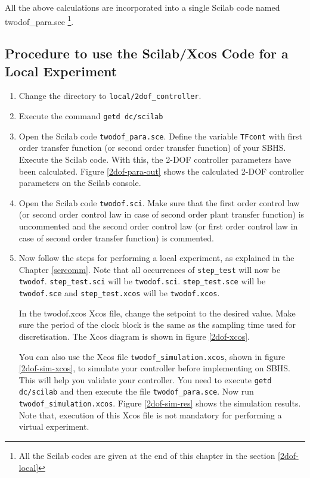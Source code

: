 All the above calculations are incorporated into a single Scilab code named {\ttfamily twodof\_para.sce} 
\footnote{All the Scilab codes are given at the end of this chapter in the section \ref{2dof-local}}.
\subsection{Procedure to use the Scilab/Xcos Code for a Local Experiment }\label{sec-steps}
\begin{enumerate}
\item Change the directory to {\tt local/2dof\_controller}. 
\item Execute the command {\tt getd dc/scilab}
\item Open the Scilab code {\tt twodof\_para.sce}. Define the variable {\tt TFcont} with first order transfer 
function (or second order transfer function) of your SBHS. Execute the Scilab code. With this, the 2-DOF controller 
parameters have been calculated. Figure \ref{2dof-para-out} shows the calculated 2-DOF controller parameters on the 
Scilab console.

\item Open the Scilab code {\tt twodof.sci}. Make sure that the first order control law (or second order control law in 
case of second order plant transfer function) is uncommented and the second order control law (or first order control law
in case of second order transfer function) is commented.
\item Now follow the steps for performing a local experiment, as explained in the Chapter \ref{sercomm}. Note that all 
occurrences of {\tt step\_test} will now be {\tt twodof}. {\tt step\_test.sci} will be {\tt twodof.sci}. {\tt  step\_test.sce}
will  be {\tt twodof.sce} and {\tt step\_test.xcos} will be {\tt twodof.xcos}.

In the {\ttfamily twodof.xcos} Xcos file, change the setpoint to the desired value. Make sure the period of the clock block
is the same as the sampling time used for discretisation.  The Xcos diagram is shown in figure \ref{2dof-xcos}. 

You can also use the Xcos file {\tt twodof\_simulation.xcos}, shown in figure \ref{2dof-sim-xcos}, to simulate your 
controller before implementing on SBHS. This will help you validate your controller. You need to execute {\tt getd dc/scilab}
and then execute the file {\tt twodof\_para.sce}. Now run {\tt twodof\_simulation.xcos}. Figure \ref{2dof-sim-res} shows the
simulation results. Note that, execution of this Xcos file is not mandatory for performing a virtual experiment.
\end{enumerate}


